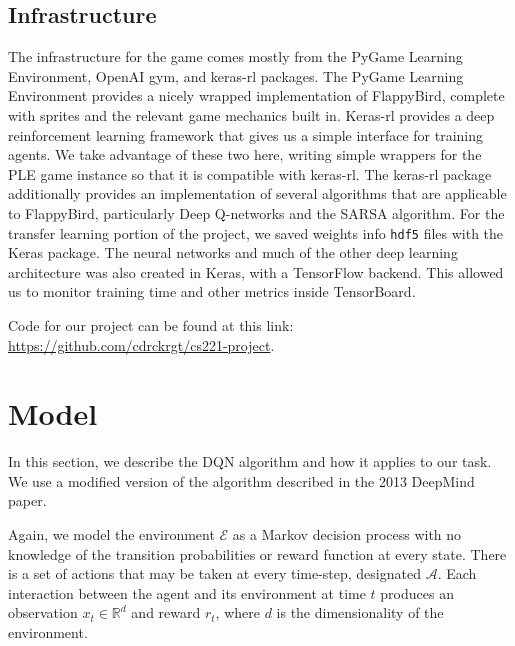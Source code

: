 \documentclass{article}
\begin{document}
\subsection{Infrastructure}

The infrastructure for the game comes mostly from the PyGame Learning Environment, OpenAI gym, and keras-rl packages. 
The PyGame Learning Environment provides a nicely wrapped implementation of FlappyBird, complete with sprites and the relevant game mechanics built in. \cite{ple} \cite{openaigym} \cite{ale}
Keras-rl provides a deep reinforcement learning framework that gives us a simple interface for training agents. 
We take advantage of these two here, writing simple wrappers for the PLE game instance so that it is compatible with keras-rl. \cite{kerasrl}
The keras-rl package additionally provides an implementation of several algorithms that are applicable to FlappyBird, particularly Deep Q-networks and the SARSA algorithm.
For the transfer learning portion of the project, we saved weights info \texttt{hdf5} files with the Keras package.
The neural networks and much of the other deep learning architecture was also created in Keras, with a TensorFlow backend. \cite{keras} \cite{tensorflow}
This allowed us to monitor training time and other metrics inside TensorBoard.

Code for our project can be found at this link: \href{https://github.com/cdrckrgt/cs221-project} {https://github.com/cdrckrgt/cs221-project}.

\section{Model}

In this section, we describe the DQN algorithm and how it applies to our task. We use a modified version of the algorithm described in the 2013 DeepMind paper.

Again, we model the environment $\mathcal{E}$ as a Markov decision process with no knowledge of the transition probabilities or reward function at every state.
There is a set of actions that may be taken at every time-step, designated $\mathcal{A}$.
Each interaction between the agent and its environment at time $t$ produces an observation $x_t \in \mathbb{R}^{d}$ and reward $r_t$, where $d$ is the dimensionality of the environment.
\end{document}
